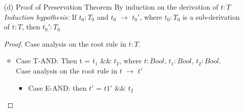 \documentclass{article}
\begin{document}
\begin{description}
\begin{enumerate}
\begin{proof}
\begin{itemize}
                                Case analysis on $t_1$ and $t_2$
                                \begin{itemize}
                                    \item Case exists $t_1'$ such that $t_1$ $\rightarrow$ $t_1'$:\\
                                        Then $t_1$ \&\& $t_2$ $\rightarrow$ $t_1'$ \&\& $t_2$ by E-AND
                                    \item Case $t_1$ is a value $v_1$ and exists $t_2'$ such that $t_2$ $\rightarrow$ $t_2'$\\
                                        Since $v_1$ is a value, by the Canonical Forms lemma, $t_1$ is either true or false. Then Case Analysis on $v_1$
                                        \begin{itemize}
                                            \item Case true, then $v_1$ \&\& $t_2$ $\rightarrow$ $t_2$, by E-ANDTRUE
                                            \item Case false, then $v_1$ \&\& $t_2$ $\rightarrow$ false by E-ANDFALSE
                                        \end{itemize}
                                \end{itemize}
                        \end{itemize}
                    \end{proof}
                \item[(d)]{Proof of Preservation Theorem}
                    By induction on the derivation of $t:T$\\
                    \textit{Induction hypothesis:} If $t_0:T_0$ and $t_0$ $\rightarrow$ $t_0'$, where $t_0:T_0$ is a sub-derivation of $t:T$, then $t_0':T_0$
                    \begin{proof}
                        Case analysis on the root rule in $t:T$.
                        \begin{itemize}
                            \item Case T-AND: Then t = $t_1$ \&\& $t_2$, where $t:Bool$, $t_1:Bool$, $t_2:Bool$. \\
                            Case analysis on the root rule in $t$ $\rightarrow$ $t'$
                            \begin{itemize}
                                \item Case E-AND: then $t'$ = $t1'$ \&\& $t_2$\\

\end{itemize}
\end{itemize}
\end{proof}
\end{enumerate}
\end{description}
\end{document}
